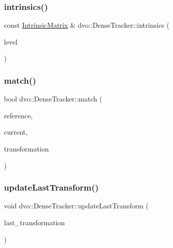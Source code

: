 \mbox{\label{classdvo_1_1_dense_tracker_a55d2374fbb13ef7846a535e1869fb880}} 
\subsubsection{\texorpdfstring{intrinsics()}{intrinsics()}}
{\footnotesize\ttfamily const \mbox{\hyperlink{structdvo_1_1core_1_1_intrinsic_matrix}{Intrinsic\+Matrix}} \& dvo\+::\+Dense\+Tracker\+::intrinsics (\begin{DoxyParamCaption}\item[{size\+\_\+t}]{level }\end{DoxyParamCaption})}

\mbox{\label{classdvo_1_1_dense_tracker_a120bade1d07eb480e7334524b3db8383}} 
\subsubsection{\texorpdfstring{match()}{match()}}
{\footnotesize\ttfamily bool dvo\+::\+Dense\+Tracker\+::match (\begin{DoxyParamCaption}\item[{\mbox{\hyperlink{structdvo_1_1core_1_1_rgbd_image_pyramid}{dvo\+::core\+::\+Rgbd\+Image\+Pyramid}} \&}]{reference,  }\item[{\mbox{\hyperlink{structdvo_1_1core_1_1_rgbd_image_pyramid}{dvo\+::core\+::\+Rgbd\+Image\+Pyramid}} \&}]{current,  }\item[{Eigen\+::\+Affine3d \&}]{transformation }\end{DoxyParamCaption})}

\mbox{\label{classdvo_1_1_dense_tracker_ae4b3faebac29274632ce464b7b016efe}} 
\subsubsection{\texorpdfstring{update\+Last\+Transform()}{updateLastTransform()}}
{\footnotesize\ttfamily void dvo\+::\+Dense\+Tracker\+::update\+Last\+Transform (\begin{DoxyParamCaption}\item[{Eigen\+::\+Affine3d \&}]{last\+\_\+transformation }\end{DoxyParamCaption})}



